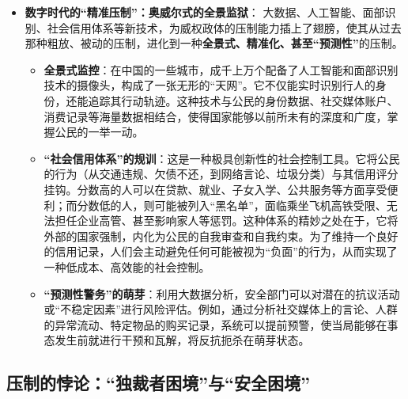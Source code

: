 \begin{itemize}
\begin{itemize}
    \end{itemize}
    \item \textbf{数字时代的“精准压制”：奥威尔式的全景监狱}：
    大数据、人工智能、面部识别、社会信用体系等新技术，为威权政体的压制能力插上了翅膀，使其从过去那种粗放、被动的压制，进化到一种\textbf{全景式、精准化、甚至“预测性”}的压制。
    \begin{itemize}
        \item \textbf{全景式监控}：在中国的一些城市，成千上万个配备了人工智能和面部识别技术的摄像头，构成了一张无形的“天网”。它不仅能实时识别行人的身份，还能追踪其行动轨迹。这种技术与公民的身份数据、社交媒体账户、消费记录等海量数据相结合，使得国家能够以前所未有的深度和广度，掌握公民的一举一动。
        \item \textbf{“社会信用体系”的规训}：这是一种极具创新性的社会控制工具。它将公民的行为（从交通违规、欠债不还，到网络言论、垃圾分类）与其信用评分挂钩。分数高的人可以在贷款、就业、子女入学、公共服务等方面享受便利；而分数低的人，则可能被列入“黑名单”，面临乘坐飞机高铁受限、无法担任企业高管、甚至影响家人等惩罚。这种体系的精妙之处在于，它将外部的国家强制，内化为公民的自我审查和自我约束。为了维持一个良好的信用记录，人们会主动避免任何可能被视为“负面”的行为，从而实现了一种低成本、高效能的社会控制。
        \item \textbf{“预测性警务”的萌芽}：利用大数据分析，安全部门可以对潜在的抗议活动或“不稳定因素”进行风险评估。例如，通过分析社交媒体上的言论、人群的异常流动、特定物品的购买记录，系统可以提前预警，使当局能够在事态发生前就进行干预和瓦解，将反抗扼杀在萌芽状态。
    \end{itemize}
\end{itemize}

\subsection{压制的悖论：“独裁者困境”与“安全困境”}

